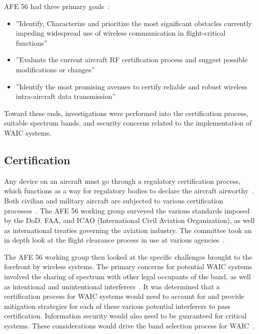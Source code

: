 AFE 56 had three primary goals~\cite{ferrell_feasibility_2007}: 

\begin{itemize}
\item ''Identify, Characterize and prioritize the most significant obstacles currently impeding widespread use of wireless communication in flight-critical functions''

\item ''Evaluate the current aircraft RF certification process and suggest possible modifications or changes''

\item ''Identify the most promising avenues to certify reliable and robust wireless intra-aircraft data transmission''
\end{itemize}

Toward these ends, investigations were performed into the certification process, suitable spectrum bands, and security concerns related to the implementation of WAIC systems. 

\subsection{Certification}
Any device on an aircraft must go through a regulatory certification process, which functions as a way for regulatory bodies to declare the aircraft airworthy~\cite{ferrell_feasibility_2007}. Both civilian and military aircraft are subjected to various certification processes~\cite{ferrell_feasibility_2007}. The AFE 56 working group surveyed the various standards imposed by the DoD, FAA, and ICAO (International Civil Aviation Organization), as well as international treaties governing the aviation industry. The committee took an in depth look at the flight clearance process in use at various agencies~\cite{ferrell_feasibility_2007}. 

The AFE 56 working group then looked at the specific challenges brought to the forefront by wireless systems. The primary concerns for potential WAIC  systems involved the sharing of spectrum with other legal occupants of the band,  as well as intentional and unintentional interferers~\cite{ferrell_feasibility_2007}. It was determined that a certification process for WAIC systems would need to account for and provide mitigation strategies for each of these various potential interferers to pass certification. Information security would also need to be guaranteed for critical systems. These considerations would drive the band selection process for WAIC~\cite{ferrell_feasibility_2007}. 

